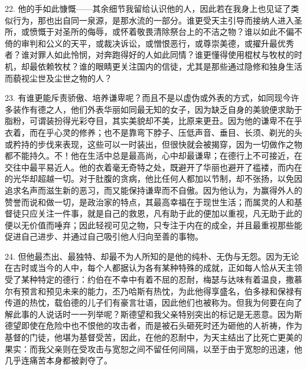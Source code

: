 22. 他的手如此慷慨——其余细节我留给认识他的人，因此若在我身上也见证了类似行为，那也出自同一泉源，是那水流的一部分。谁更受天主引导而接纳人进入圣所，或愤慨于对圣所的侮辱，或怀着敬畏清除祭台上的不洁之物？谁以如此不偏不倚的审判和公义的天平，或裁决诉讼，或憎恨恶行，或尊崇美德，或擢升最优秀者？谁对罪人如此怜悯，对奔跑得好的人如此同情？谁更懂得使用棍杖与牧杖的时机，却最依赖牧杖？谁的眼睛更关注国内的信徒，尤其是那些通过隐修和独身生活而藐视尘世及尘世之物的人？\par

23. 有谁更能斥责骄傲、培养谦卑呢？而且不是以虚伪或外表的方式，如同现今许多装作有德之人，他们外表华丽如同最无知的女子，因为缺乏自身的美貌便求助于脂粉，可谓装扮得光彩夺目，其实美貌却不美，比原来更丑。因为他的谦卑不在乎衣着，而在乎心灵的修养；也不是靠弯下脖子、压低声音、垂目、长须、剃光的头或矜持的步伐来表现，这些可以一时装出，但很快就会被揭穿，因为一切做作之物都不能持久。不！他在生活中总是最高尚，心中却最谦卑；在德行上不可接近，在交往中最平易近人。他的衣着毫无奇特之处，既避开了华丽也避开了褴褛，而内在的光华却超越一切。对于肚腹的贪病，他比任何人都加以节制，却不张扬，以免因追求名声而滋生新的恶习，而又能保持谦卑而不自傲。因为他认为，为赢得外人的赞誉而说和做一切，是政治家的特点，其最高幸福在于现世生活；而属灵的人和基督徒只应关注一件事，就是自己的救恩，凡有助于此的便加以重视，凡无助于此的便以无价值而唾弃；因此轻视可见之物，只专注于内在的成全，并且最重视那些能促进自己进步、并通过自己吸引他人归向至善的事物。\par

24. 但他最杰出、最独特、却最不为人所知的是他的纯朴、无伪与无怨。因为无论在古时或当今的人中，每个人都据认为各有某种特殊的成就，正如每人恰从天主领受了某种特定的德行：约伯在不幸中有着不屈的忍耐，梅瑟与达味有着温良，撒慕尔有预言和预见未来的能力，丕乃哈斯有热忱，为此他得享盛名，伯多禄和保禄有传道的热忱，载伯德的儿子们有豪言壮语，因此他们也被称为。但我为何要在向了解此事的人说话时一一列举呢？斯德望和我父亲特别突出的标记是无恶意。因为斯德望即使在危险中也不恨他的攻击者，而是被石头砸死时还为砸他的人祈祷，作为基督的门徒，他堪为基督受苦，因此，在他的忍耐中，为天主结出了比死亡更美的果实：而我父亲则在受攻击与宽恕之间不留任何间隔，以至于由于宽恕的迅速，他几乎连痛苦本身都被剥夺了。\par

